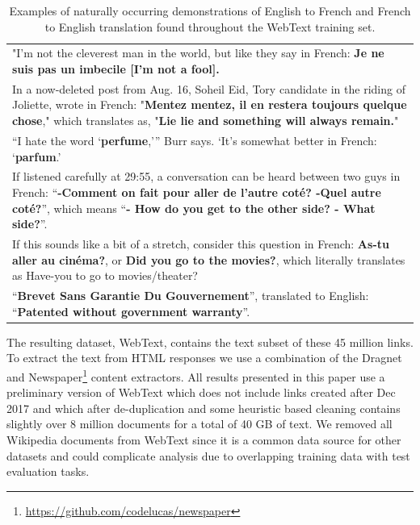 \documentclass{article}
\begin{document}
\begin{table}[t]
\begin{center}
\begin{small}
\begin{tabular}{p{7.75cm}}
\toprule
"I'm not the cleverest man in the world, but like they say in French: \textbf{Je ne suis pas un imbecile [I'm not a fool].} \\[0.25cm]
In a now-deleted post from Aug. 16, Soheil Eid, Tory candidate in the riding of Joliette, wrote in French: "\textbf{Mentez mentez, il en restera toujours quelque chose}," which translates as, "\textbf{Lie lie and something will always remain.}" \\[0.25cm]
``I hate the word `\textbf{perfume},''' Burr says. `It's somewhat better in French: `\textbf{parfum}.' \\[0.25cm]
If listened carefully at 29:55, a conversation can be heard between two guys in French: ``\textbf{-Comment on fait pour aller de l'autre coté? -Quel autre coté?}'', which means ``\textbf{- How do you get to the other side? - What side?}''. \\[0.25cm]
If this sounds like a bit of a stretch, consider this question in French: \textbf{As-tu aller au cinéma?}, or \textbf{Did you go to the movies?}, which literally translates as Have-you to go to movies/theater? \\[0.25cm]
``\textbf{Brevet Sans Garantie Du Gouvernement}'', translated to English: ``\textbf{Patented without government warranty}''.
\bottomrule
\end{tabular}
\end{small}
\caption{Examples of naturally occurring demonstrations of English to French and French to English translation found throughout the WebText training set.}
\label{taskdemonstration}
\end{center}
\end{table}

The resulting dataset, WebText, contains the text subset of these 45 million links. To extract the text from HTML responses we use a combination of the Dragnet \cite{peters2013content} and Newspaper\footnote{\url{https://github.com/codelucas/newspaper}} content extractors. All results presented in this paper use a preliminary version of WebText which does not include links created after Dec 2017 and which after de-duplication and some heuristic based cleaning contains slightly over 8 million documents for a total of 40 GB of text. We removed all Wikipedia documents from WebText since it is a common data source for other datasets and could complicate analysis due to overlapping training data with test evaluation tasks.
\end{document}
